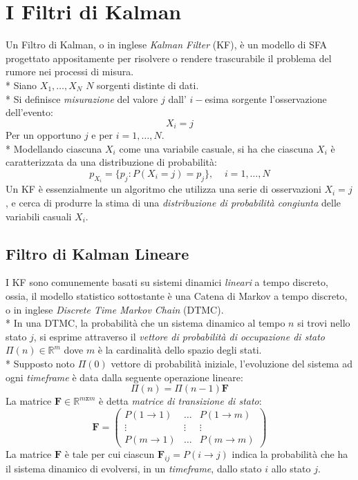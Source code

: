 \section{I Filtri di Kalman}
Un Filtro di Kalman, o in inglese \emph{Kalman Filter} (KF), \`e un modello di SFA progettato appositamente per risolvere o rendere trascurabile il problema del rumore nei processi di misura.\\*
Siano $X_1,\dots,X_N$ $N$ sorgenti distinte di dati.\\*
Si definisce \emph{misurazione} del valore $j$ dall' $i-$esima sorgente l'osservazione dell'evento:
$$
X_i = j
$$
Per un opportuno $j$ e per $i = 1,\dots,N$.\\*
Modellando ciascuna $X_i$ come una variabile casuale, si ha che ciascuna $X_i$ \`e caratterizzata da una distribuzione di probabilit\`a:
$$
p_{X_i} = \{p_j:P(X_i = j) = p_j\},\;\;\;\;i = 1,\dots,N
$$
Un KF \`e essenzialmente un algoritmo che utilizza una serie di osservazioni $X_i = j$, e cerca di produrre la stima di una \emph{distribuzione di probabilit\`a congiunta} delle variabili casuali $X_i$.
\subsection{Filtro di Kalman Lineare}
I KF sono comunemente basati su sistemi dinamici \emph{lineari} a tempo discreto, ossia, il modello statistico sottostante \`e una Catena di Markov a tempo discreto, o in inglese \emph{Discrete Time Markov Chain} (DTMC).\\*
In una DTMC, la probabilit\`a che un sistema dinamico al tempo $n$ si trovi nello stato $j$, si esprime attraverso il \emph{vettore di probabilit\`a di occupazione di stato} $\Pi(n) \in \mathbb{R}^m$ dove $m$ \`e la cardinalit\`a dello spazio degli stati.\\*
Supposto noto $\Pi(0)$ vettore di probabilit\`a iniziale, l'evoluzione del sistema ad ogni \emph{timeframe} \`e data dalla seguente operazione lineare:
$$
\Pi(n) = \Pi(n-1)\mathbf{F}
$$
La matrice $\mathbf{F} \in \mathbb{R}^{m \mathtt{x} m}$ \`e detta \emph{matrice di transizione di stato}:
$$
\mathbf{F} = \left(\begin{matrix}
P(1\rightarrow1)&\dots&P(1\rightarrow m)\\
\vdots&\vdots&\vdots\\
P(m\rightarrow 1)&\dots&P(m\rightarrow m)
\end{matrix}\right)
$$
La matrice $\mathbf{F}$ \`e tale per cui ciascun $\mathbf{F}_{ij} = P(i\rightarrow j)$ indica la probabilit\`a che ha il sistema dinamico di evolversi, in un \emph{timeframe}, dallo stato $i$ allo stato $j$.